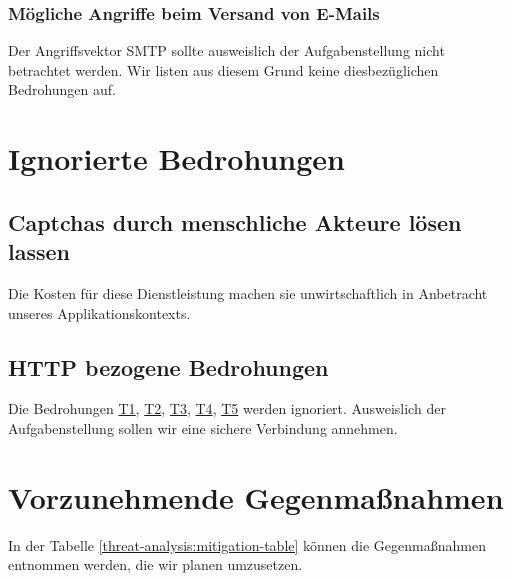 \documentclass[12pt,DIV14,BCOR10mm,a4paper,parskip=half-,headsepline,headinclude,english,ngerman,bibliography=totocnumbered]{scrreprt}
\begin{document}
\subsubsection{Mögliche Angriffe beim Versand von E-Mails}
Der Angriffsvektor SMTP sollte ausweislich der Aufgabenstellung nicht betrachtet werden. Wir listen aus diesem Grund keine diesbezüglichen Bedrohungen auf.

\newcommand{\linktothreat}[2]{\texorpdfstring{\protect\hyperlink{#1}{#2}}{}}%

\section{Ignorierte Bedrohungen}
\subsection{Captchas durch menschliche Akteure lösen lassen}
Die Kosten für diese Dienstleistung machen sie unwirtschaftlich in Anbetracht unseres Applikationskontexts.

\subsection{HTTP bezogene Bedrohungen}
Die Bedrohungen \linktothreat{threat1}{T1}, \linktothreat{threat2}{T2}, \linktothreat{threat3}{T3}, \linktothreat{threat4}{T4}, \linktothreat{threat5}{T5} werden ignoriert.
Ausweislich der Aufgabenstellung sollen wir eine sichere Verbindung annehmen.

\section{Vorzunehmende Gegenmaßnahmen}

In der Tabelle \ref{threat-analysis:mitigation-table} können die Gegenmaßnahmen entnommen werden, die wir planen umzusetzen.
\end{document}
